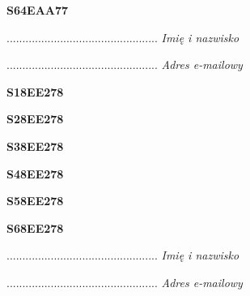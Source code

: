 \begin{turn}{90}\huge \textbf{S64EAA77}\end{turn}

\begin{turn}{90}\begin{minipage}{\linewidth} \vspace{20mm} ................................................  \textit{Imię i nazwisko}\end{minipage}\end{turn}

\begin{turn}{90}\begin{minipage}{\linewidth} \vspace{20mm} ................................................  \textit{Adres e-mailowy}\end{minipage}\end{turn}

\begin{turn}{90}\huge \textbf{S18EE278}\end{turn}

\begin{turn}{90}\huge \textbf{S28EE278}\end{turn}

\begin{turn}{90}\huge \textbf{S38EE278}\end{turn}

\begin{turn}{90}\huge \textbf{S48EE278}\end{turn}

\begin{turn}{90}\huge \textbf{S58EE278}\end{turn}

\begin{turn}{90}\huge \textbf{S68EE278}\end{turn}

\begin{turn}{90}\begin{minipage}{\linewidth} \vspace{20mm} ................................................  \textit{Imię i nazwisko}\end{minipage}\end{turn}

\begin{turn}{90}\begin{minipage}{\linewidth} \vspace{20mm} ................................................  \textit{Adres e-mailowy}\end{minipage}\end{turn}


